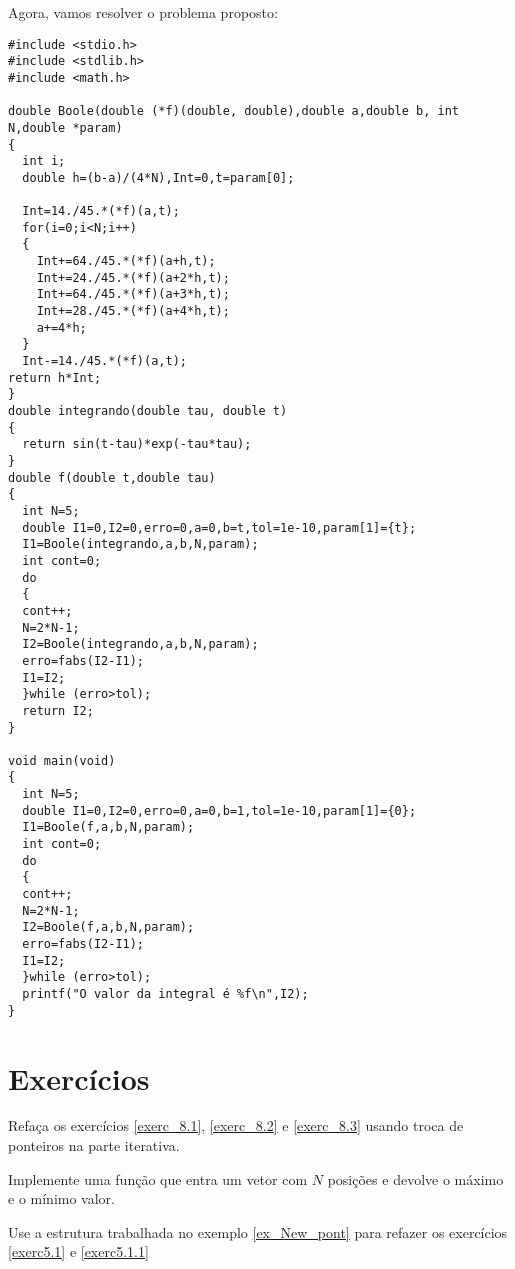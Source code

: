 Agora, vamos resolver o problema proposto:
\begin{verbatim}
#include <stdio.h>
#include <stdlib.h>
#include <math.h>

double Boole(double (*f)(double, double),double a,double b, int N,double *param)
{
  int i;
  double h=(b-a)/(4*N),Int=0,t=param[0];
  
  Int=14./45.*(*f)(a,t);
  for(i=0;i<N;i++)
  {
    Int+=64./45.*(*f)(a+h,t);
    Int+=24./45.*(*f)(a+2*h,t);
    Int+=64./45.*(*f)(a+3*h,t);
    Int+=28./45.*(*f)(a+4*h,t);
    a+=4*h;
  }
  Int-=14./45.*(*f)(a,t);
return h*Int;
}
double integrando(double tau, double t)
{
  return sin(t-tau)*exp(-tau*tau);
}
double f(double t,double tau)
{
  int N=5;
  double I1=0,I2=0,erro=0,a=0,b=t,tol=1e-10,param[1]={t};
  I1=Boole(integrando,a,b,N,param);
  int cont=0;
  do
  {
  cont++;
  N=2*N-1;
  I2=Boole(integrando,a,b,N,param);
  erro=fabs(I2-I1);
  I1=I2;
  }while (erro>tol);
  return I2;
}

void main(void)
{
  int N=5;
  double I1=0,I2=0,erro=0,a=0,b=1,tol=1e-10,param[1]={0};
  I1=Boole(f,a,b,N,param);
  int cont=0;
  do
  {
  cont++;
  N=2*N-1;
  I2=Boole(f,a,b,N,param);
  erro=fabs(I2-I1);
  I1=I2;
  }while (erro>tol);
  printf("O valor da integral é %f\n",I2);
}
\end{verbatim}

\section{Exercícios}
\begin{exer}
Refaça os exercícios \ref{exerc_8.1}, \ref{exerc_8.2} e \ref{exerc_8.3} usando troca de ponteiros na parte iterativa.
\end{exer}

\begin{exer}
 Implemente uma função que entra um vetor com $N$ posições e devolve o máximo e o mínimo valor.
\end{exer}
\begin{exer}
Use a estrutura trabalhada no exemplo \ref{ex_New_pont} para refazer os exercícios \ref{exerc5.1} e \ref{exerc5.1.1}
\end{exer}

